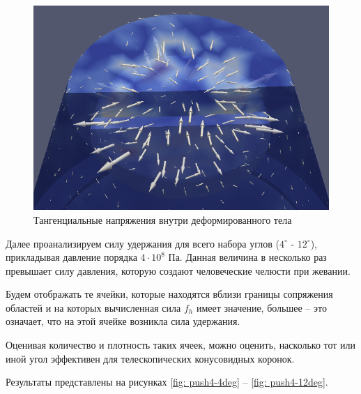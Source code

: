 \documentclass[a4paper, 14pt]{extreport}
\begin{document}
\begin{figure}[H]
	\center
	\includegraphics[scale=0.55]{pictures/result_push_shear_stress_partial.png}
	\caption{Тангенциальные напряжения  внутри деформированного тела}
	\label{fig: result_push_shear_stress_partial}
\end{figure}

Далее проанализируем силу удержания для всего набора углов 
($4^{\circ}$ - $12^{\circ}$), прикладывая давление 
порядка $4\cdot10^8$ Па. Данная величина в несколько раз
превышает 
силу давления, которую создают человеческие челюсти при
жевании.

Будем отображать те ячейки, которые находятся вблизи 
границы сопряжения областей и на которых вычисленная сила
$f_h$ имеет значение, большее -- это означает, что на этой 
ячейке возникла сила удержания.

Оценивая количество и плотность таких ячеек, можно оценить,
насколько тот или иной угол эффективен для телескопических 
конусовидных коронок.

Результаты представлены на рисунках \ref{fig: push4-4deg} -- 
\ref{fig: push4-12deg}.
\end{document}

